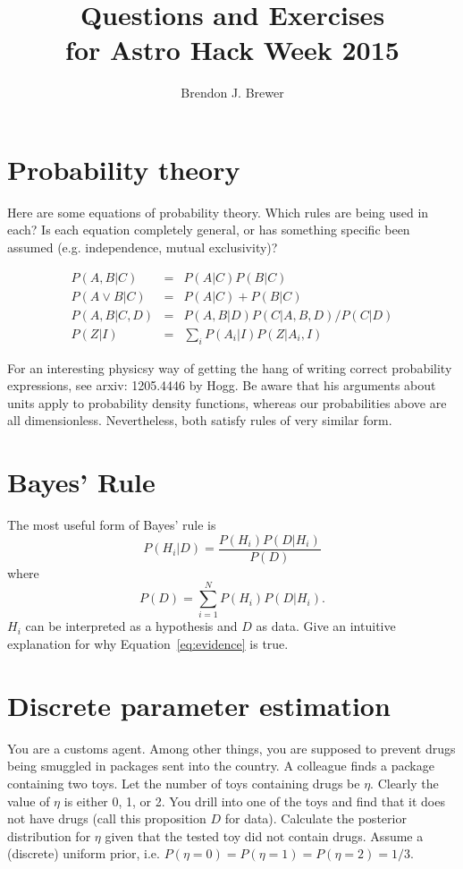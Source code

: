 \documentclass[a4paper, 11pt]{article}
\title{Questions and Exercises\\
for Astro Hack Week 2015}
\author{Brendon J. Brewer}
\begin{document}
\maketitle

\section{Probability theory}
Here are some equations of probability theory. Which rules are being used in
each? Is each equation completely general, or has something specific been
assumed (e.g. independence, mutual exclusivity)?

\begin{eqnarray}
P(A, B | C) &=& P(A | C) P (B | C)\\
P(A \vee B | C) &=& P(A | C) + P(B | C)\\
P(A, B | C, D) &=& P(A, B | D)P(C | A, B, D)/P(C | D)\\
P(Z | I) &=& \sum_i P(A_i | I)P(Z | A_i, I)
\end{eqnarray}

For an interesting physicsy way of getting the hang of writing correct
probability expressions, see arxiv: 1205.4446 by Hogg. Be aware that his
arguments about units apply to probability density functions, whereas
our probabilities above are all dimensionless. Nevertheless, both satisfy rules
of very similar form.


\section{Bayes' Rule}
The most useful form of Bayes' rule is
\begin{equation}
P(H_i | D) = \frac{P(H_i)P(D|H_i)}{P(D)}
\end{equation}
where
\begin{equation}
P(D) = \sum_{i=1}^N P(H_i)P(D|H_i).\label{eq:evidence}
\end{equation}
$H_i$ can be interpreted as a hypothesis and $D$ as data.
Give an intuitive explanation for why Equation~\ref{eq:evidence} is true.

\section{Discrete parameter estimation}
You are a customs agent. Among other things, you are supposed to prevent
drugs being smuggled in packages sent into the country. A colleague finds a
package containing two toys. Let the number of toys containing drugs be
$\eta$. Clearly the value of $\eta$ is either 0, 1, or 2. You drill into
one of the toys and find that it does not have drugs (call this proposition
$D$ for data).
Calculate the posterior distribution for $\eta$ given that the tested
toy did not contain drugs. Assume a (discrete) uniform prior, i.e.
$P(\eta=0) = P(\eta=1) = P(\eta=2) = 1/3$.
\end{document}
